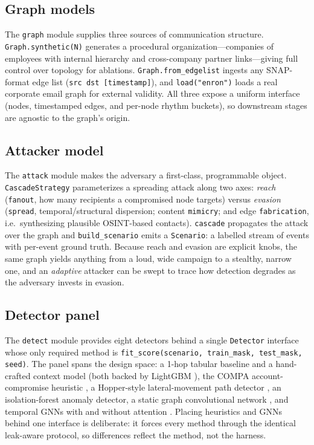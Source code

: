 \subsection{Graph models}
The \texttt{graph} module supplies three sources of communication structure.
\texttt{Graph.synthetic(N)} generates a procedural organization---companies of employees with
internal hierarchy and cross-company partner links---giving full control over topology for
ablations. \texttt{Graph.from\_edgelist} ingests any SNAP-format edge list
\cite{leskovec2014snap} (\texttt{src dst [timestamp]}), and \texttt{load("enron")} loads a
real corporate email graph \cite{klimt2004enron} for external validity. All three expose a
uniform interface (nodes, timestamped edges, and per-node rhythm buckets), so downstream
stages are agnostic to the graph's origin.

\subsection{Attacker model}
The \texttt{attack} module makes the adversary a first-class, programmable object.
\texttt{CascadeStrategy} parameterizes a spreading attack along two axes: \emph{reach}
(\texttt{fanout}, how many recipients a compromised node targets) versus \emph{evasion}
(\texttt{spread}, temporal/structural dispersion; content \texttt{mimicry}; and edge
\texttt{fabrication}, i.e.\ synthesizing plausible OSINT-based contacts). \texttt{cascade}
propagates the attack over the graph and \texttt{build\_scenario} emits a \texttt{Scenario}:
a labelled stream of events with per-event ground truth. Because reach and evasion are
explicit knobs, the same graph yields anything from a loud, wide campaign to a stealthy,
narrow one, and an \emph{adaptive} attacker can be swept to trace how detection degrades as
the adversary invests in evasion.

\subsection{Detector panel}
The \texttt{detect} module provides eight detectors behind a single \texttt{Detector}
interface whose only required method is
\texttt{fit\_score(scenario, train\_mask, test\_mask, seed)}. The panel spans the design
space: a 1-hop tabular baseline and a hand-crafted context model (both backed by LightGBM
\cite{ke2017lightgbm}), the COMPA account-compromise heuristic \cite{egele2013compa}, a
Hopper-style lateral-movement path detector \cite{ho2021hopper}, an isolation-forest anomaly
detector, a static graph convolutional network \cite{kipf2017semisupervised}, and temporal
GNNs with and without attention \cite{rossi2020temporal,xu2020inductive,velickovic2018graph}.
Placing heuristics and GNNs behind one interface is deliberate: it forces every method through
the identical leak-aware protocol, so differences reflect the method, not the harness.

